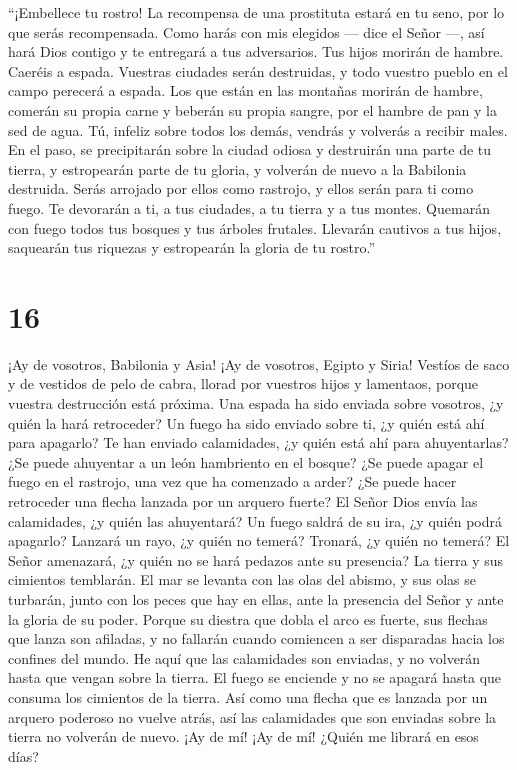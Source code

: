  ``¡Embellece tu rostro!  La recompensa de
una prostituta estará en tu seno, por lo que serás recompensada.
 Como harás con mis elegidos --- dice el Señor ---, así
hará Dios contigo y te entregará a tus adversarios.  Tus
hijos morirán de hambre. Caeréis a espada. Vuestras ciudades serán
destruidas, y todo vuestro pueblo en el campo perecerá a espada.
 Los que están en las montañas morirán de hambre, comerán
su propia carne y beberán su propia sangre, por el hambre de pan y la
sed de agua.  Tú, infeliz sobre todos los demás, vendrás
y volverás a recibir males.  En el paso, se precipitarán
sobre la ciudad odiosa y destruirán una parte de tu tierra, y
estropearán parte de tu gloria, y volverán de nuevo a la Babilonia
destruida.  Serás arrojado por ellos como rastrojo, y
ellos serán para ti como fuego.  Te devorarán a ti, a tus
ciudades, a tu tierra y a tus montes. Quemarán con fuego todos tus
bosques y tus árboles frutales.  Llevarán cautivos a tus
hijos, saquearán tus riquezas y estropearán la gloria de tu rostro.''

\hypertarget{section-15}{%
\section{16}\label{section-15}}

 ¡Ay de vosotros, Babilonia y Asia! ¡Ay de vosotros,
Egipto y Siria!  Vestíos de saco y de vestidos de pelo de
cabra, llorad por vuestros hijos y lamentaos, porque vuestra destrucción
está próxima.  Una espada ha sido enviada sobre vosotros,
¿y quién la hará retroceder?  Un fuego ha sido enviado
sobre ti, ¿y quién está ahí para apagarlo?  Te han enviado
calamidades, ¿y quién está ahí para ahuyentarlas?  ¿Se
puede ahuyentar a un león hambriento en el bosque? ¿Se puede apagar el
fuego en el rastrojo, una vez que ha comenzado a arder? 
¿Se puede hacer retroceder una flecha lanzada por un arquero fuerte?
 El Señor Dios envía las calamidades, ¿y quién las
ahuyentará?  Un fuego saldrá de su ira, ¿y quién podrá
apagarlo?  Lanzará un rayo, ¿y quién no temerá? Tronará,
¿y quién no temerá?  El Señor amenazará, ¿y quién no se
hará pedazos ante su presencia?  La tierra y sus
cimientos temblarán. El mar se levanta con las olas del abismo, y sus
olas se turbarán, junto con los peces que hay en ellas, ante la
presencia del Señor y ante la gloria de su poder.  Porque
su diestra que dobla el arco es fuerte, sus flechas que lanza son
afiladas, y no fallarán cuando comiencen a ser disparadas hacia los
confines del mundo.  He aquí que las calamidades son
enviadas, y no volverán hasta que vengan sobre la tierra.
 El fuego se enciende y no se apagará hasta que consuma
los cimientos de la tierra.  Así como una flecha que es
lanzada por un arquero poderoso no vuelve atrás, así las calamidades que
son enviadas sobre la tierra no volverán de nuevo.  ¡Ay
de mí! ¡Ay de mí! ¿Quién me librará en esos días?

